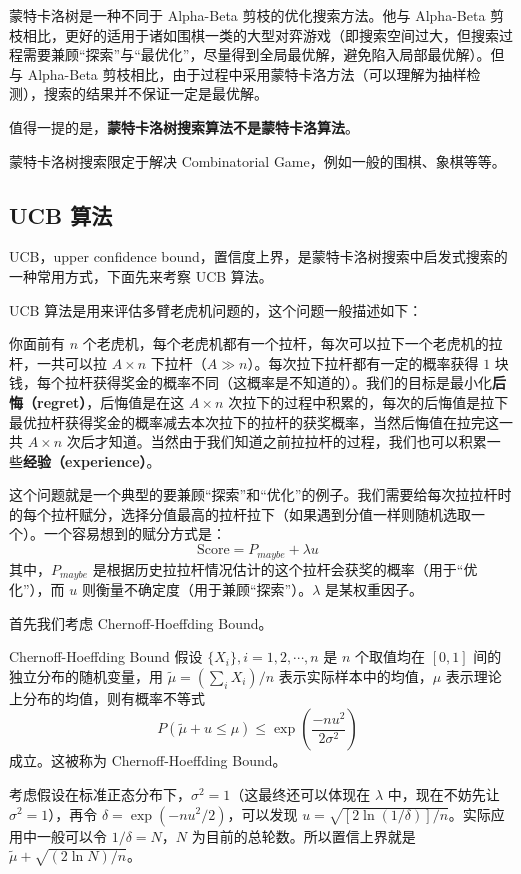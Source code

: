 
\begin{issues}
\issueDraft
\issueTODO
\end{issues}


蒙特卡洛树是一种不同于 Alpha-Beta 剪枝的优化搜索方法。他与 Alpha-Beta 剪枝相比，更好的适用于诸如围棋一类的大型对弈游戏（即搜索空间过大，但搜索过程需要兼顾“探索”与“最优化”，尽量得到全局最优解，避免陷入局部最优解）。但与 Alpha-Beta 剪枝相比，由于过程中采用蒙特卡洛方法（可以理解为抽样检测），搜索的结果并不保证一定是最优解。

值得一提的是，\textbf{蒙特卡洛树搜索算法不是蒙特卡洛算法}。

蒙特卡洛树搜索限定于解决 Combinatorial Game，例如一般的围棋、象棋等等。

\subsection{UCB 算法}
UCB，upper confidence bound，置信度上界，是蒙特卡洛树搜索中启发式搜索的一种常用方式，下面先来考察 UCB 算法。





UCB 算法是用来评估多臂老虎机问题的，这个问题一般描述如下：

你面前有 $n$ 个老虎机，每个老虎机都有一个拉杆，每次可以拉下一个老虎机的拉杆，一共可以拉 $A\times n$ 下拉杆（$A \gg n$）。每次拉下拉杆都有一定的概率获得 $1$ 块钱，每个拉杆获得奖金的概率不同（这概率是不知道的）。我们的目标是最小化\textbf{后悔（regret）}，后悔值是在这 $A\times n$ 次拉下的过程中积累的，每次的后悔值是拉下最优拉杆获得奖金的概率减去本次拉下的拉杆的获奖概率，当然后悔值在拉完这一共 $A\times n$ 次后才知道。当然由于我们知道之前拉拉杆的过程，我们也可以积累一些\textbf{经验（experience）}。

这个问题就是一个典型的要兼顾“探索”和“优化”的例子。我们需要给每次拉拉杆时的每个拉杆赋分，选择分值最高的拉杆拉下（如果遇到分值一样则随机选取一个）。一个容易想到的赋分方式是：
$$\text{Score} = P_{maybe} + \lambda u ~~$$
其中，$P_{maybe}$ 是根据历史拉拉杆情况估计的这个拉杆会获奖的概率（用于“优化”），而 $u$ 则衡量不确定度（用于兼顾“探索”）。$\lambda$ 是某权重因子。

首先我们考虑 Chernoff-Hoeffding Bound。
\begin{theorem}{Chernoff-Hoeffding Bound}
假设 $\{X_i\}, i=1, 2, \cdots, n$ 是 $n$ 个取值均在 $[0, 1]$ 间的独立分布的随机变量，用 $\widetilde \mu = \left(\sum_{i} X_i\right)/n$ 表示实际样本中的均值，$\mu$ 表示理论上分布的均值，则有概率不等式
$$P\left(\widetilde \mu + u \le \mu\right) \le \exp\left(\frac{-n u^2}{2 \sigma^2}\right) ~~$$
成立。这被称为 Chernoff-Hoeffding Bound。
\end{theorem}
考虑假设在标准正态分布下，$\sigma^2=1$（这最终还可以体现在 $\lambda$ 中，现在不妨先让 $\sigma^2=1$），再令 $\delta = \exp\left(-nu^2/2\right)$，可以发现 $u=\sqrt{[2 \ln(1/\delta)]/n}$。实际应用中一般可以令 $1/\delta=N$，$N$ 为目前的总轮数。所以置信上界就是 $\widetilde \mu + \sqrt{\left(2 \ln N \right)/n}$。

